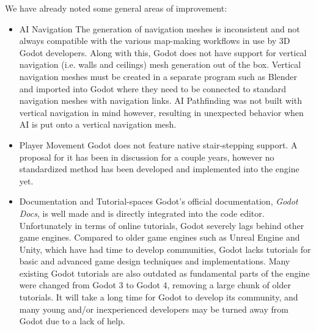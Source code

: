 \documentclass[legalpaper]{ltxdoc}
\begin{document}
	We have already noted some general areas of improvement:
	\begin{itemize}
		\item AI Navigation
		\subitem The generation of navigation meshes is inconsistent and not always compatible with the various map-making workflows in use by 3D Godot developers. Along with this, Godot does not have support for vertical navigation (i.e. walls and ceilings) mesh generation out of the box. Vertical navigation meshes must be created in a separate program such as Blender and imported into Godot where they need to be connected to standard navigation meshes with navigation links.
		\subitem AI Pathfinding was not built with vertical navigation in mind however, resulting in unexpected behavior when AI is put onto a vertical navigation mesh.
		
		\item Player Movement
		\subitem Godot does not feature native stair-stepping support. A proposal for it has been in discussion for a couple years, however no standardized method has been developed and implemented into the engine yet.
		
		\item Documentation and Tutorial-spaces
		\subitem Godot's official documentation, \textit{Godot Docs}, is well made and is directly integrated into the code editor.
		\subitem Unfortunately in terms of online tutorials, Godot severely lags behind other game engines. Compared to older game engines such as Unreal Engine and Unity, which have had time to develop communities, Godot lacks tutorials for basic and advanced game design techniques and implementations. Many existing Godot tutorials are also outdated as fundamental parts of the engine were changed from Godot 3 to Godot 4, removing a large chunk of older tutorials. It will take a long time for Godot to develop its community, and many young and/or inexperienced developers may be turned away from Godot due to a lack of help.
	\end{itemize}
	
	
	
\end{document}
